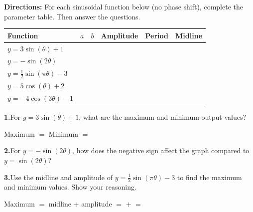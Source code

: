 \documentclass[10pt]{article}
\begin{document}
\begin{tcolorbox}[colback=white, colframe=black!40,
    title=\textbf{Tier R --- Reinforce},
    fonttitle=\bfseries, arc=2mm, left=3mm, right=3mm, top=2mm, bottom=2mm]

\textbf{Directions:} For each sinusoidal function below (no phase shift),
complete the parameter table. Then answer the questions.

\vspace{4pt}
\renewcommand{\arraystretch}{1.6}
\begin{tabular}{|l|c|c|c|c|c|}
\hline
\textbf{Function} & \textbf{$a$} & \textbf{$b$} & \textbf{Amplitude} & \textbf{Period} & \textbf{Midline} \\
\hline
$y = 3\sin(\theta) + 1$ & & & & & \\
\hline
$y = -\sin(2\theta)$ & & & & & \\
\hline
$y = \tfrac{1}{2}\sin(\pi\theta) - 3$ & & & & & \\
\hline
$y = 5\cos(\theta) + 2$ & & & & & \\
\hline
$y = -4\cos(3\theta) - 1$ & & & & & \\
\hline
\end{tabular}

\vspace{8pt}
\textbf{1.}\quad For $y = 3\sin(\theta)+1$, what are the maximum and minimum output values?

\vspace{4pt}
Maximum $= $ \underline{\hspace{2cm}} \qquad Minimum $= $ \underline{\hspace{2cm}}

\vspace{6pt}
\textbf{2.}\quad For $y = -\sin(2\theta)$, how does the negative sign affect the graph
compared to $y = \sin(2\theta)$?


\vspace{6pt}
\textbf{3.}\quad Use the midline and amplitude of $y = \tfrac{1}{2}\sin(\pi\theta) - 3$
to find the maximum and minimum values. Show your reasoning.

\vspace{4pt}
Maximum $= $ midline $+$ amplitude $= $ \underline{\hspace{1cm}} $+$ \underline{\hspace{1cm}} $=$ \underline{\hspace{1.5cm}}


\end{tcolorbox}
\end{document}
